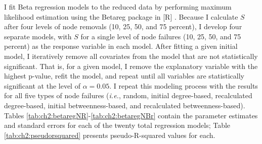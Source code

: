 I fit Beta regression models to the reduced data by performing maximum likelihood estimation using the Betareg package \cite{Cribari2010} in [R] \cite{R2012}. Because I calculate $S$ after four levels of node removals (10, 25, 50, and 75 percent), I develop four separate models, with $S$ for a single level of node failures (10, 25, 50, and 75 percent) as the response variable in each model.  After fitting a given initial model, I iteratively remove all covariates from the model that are not statistically significant. That is, for a given model, I remove the explanatory variable with the highest p-value, refit the model, and repeat until all variables are statistically significant at the level of $\alpha = 0.05$.  I repeat this modeling process with the results for all five types of node failures (\emph{i.e.}, random, initial degree-based, recalculated degree-based, initial betweenness-based, and recalculated betweenness-based). Tables \ref{tab:ch2:betaregNR}-\ref{tab:ch2:betaregNBr} contain the parameter estimates and standard errors for each of the twenty total regression models; Table \ref{tab:ch2:pseudorsquared} presents pseudo-R-squared values for each.


